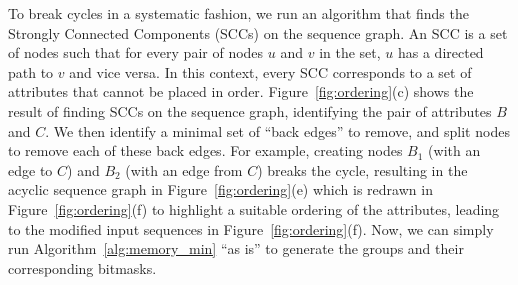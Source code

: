 To break cycles in a systematic fashion, we run an algorithm that finds the Strongly Connected Components (SCCs) on the sequence graph.  An SCC is a set of nodes such that for every pair of nodes $u$ and $v$ in the set, $u$ has a directed path to $v$ and vice versa. In this context, every SCC corresponds to a set of attributes that cannot be placed in order.  Figure~\ref{fig:ordering}(c) shows the result of finding SCCs on the sequence graph, identifying the pair of attributes $B$ and $C$. We then identify a minimal set of ``back edges'' to remove, and split nodes to remove each of these back edges.  For example, creating nodes $B_1$ (with an edge {to} $C$) and $B_2$ (with an edge {from} $C$) breaks the cycle, resulting in the acyclic sequence graph in Figure~\ref{fig:ordering}(e) which is redrawn in Figure~\ref{fig:ordering}(f) to highlight a suitable ordering of the attributes, leading to the modified input sequences in Figure~\ref{fig:ordering}(f).  Now, we can simply run Algorithm~\ref{alg:memory_min} ``as is'' to generate the groups and their corresponding bitmasks.

%




